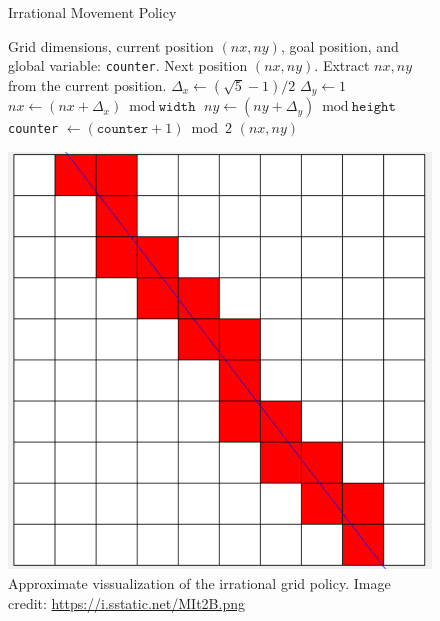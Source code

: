 \documentclass{article}
\begin{document}
\begin{figure}[H]
    \centering
    \begin{minipage}{0.5\textwidth}
        \begin{algorithm}[H]
            \caption{Irrational Movement Policy}\label{alg:diagonal}
            \begin{algorithmic}[1]
                \Require Grid dimensions, current position $(nx, ny)$, goal position, and global variable: \texttt{counter}.
                \Ensure Next position $(nx, ny)$.
                \State Extract $nx, ny$ from the current position.
                \State $\Delta_x \gets (\sqrt{5} - 1) / 2$ 
                \State $\Delta_y \gets 1$
                 
                \State $nx \gets (nx + \Delta_x) \bmod \texttt{width}$
                 
                \State $ny \gets (ny + \Delta_y) \bmod \texttt{height}$
                \EndIf
                \State \texttt{counter} $\gets (\texttt{counter} + 1) \bmod 2$
                \State \Return $(nx, ny)$
            \end{algorithmic}
        \end{algorithm}
    \end{minipage}
    \hfill
    \begin{minipage}{0.45\textwidth}
        \centering
        \includegraphics[width=\linewidth]{grid_irrational.png}
        \caption{Approximate vissualization of the irrational grid policy. Image credit: \url{https://i.sstatic.net/MIt2B.png}}
        \label{fig:visualization-of-diagonal-algorithm}
    \end{minipage}
\end{figure}
\end{document}
